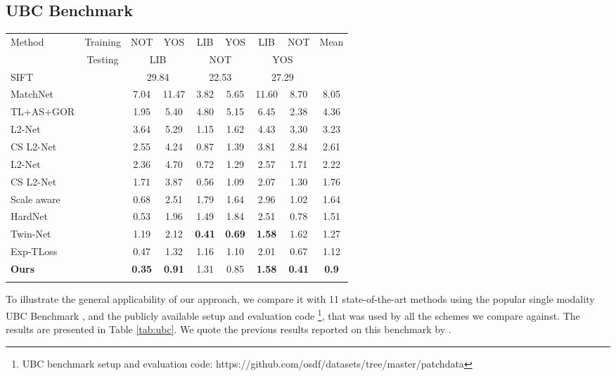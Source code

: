\documentclass[10pt,journal]{IEEEtran}\usepackage{amsfonts}
\begin{document}
\subsection{UBC Benchmark}

\begin{table*}[th]
\centering
\begin{tabular}{lcccccccc}
\toprule Method & Training & NOT & YOS & LIB & YOS & LIB & NOT & Mean \\
\multicolumn{1}{c}{} & Testing & \multicolumn{2}{c}{LIB} &
\multicolumn{2}{c}{NOT} & \multicolumn{2}{c}{YOS} &  \\
\midrule SIFT \cite{SIFT} &  & \multicolumn{2}{c}{29.84} &
\multicolumn{2}{c}{22.53} & \multicolumn{2}{c}{27.29} &  \\
MatchNet \cite{MatchNet} &  & 7.04 & 11.47 & 3.82 & 5.65 & 11.60 & 8.70 &
8.05 \\
TL+AS+GOR \cite{SpreadOutDescriptors} &  & 1.95 & 5.40 & 4.80 & 5.15 & 6.45
& 2.38 & 4.36 \\
L2-Net \cite{L2Net} &  & 3.64 & 5.29 & 1.15 & 1.62 & 4.43 & 3.30 & 3.23 \\
CS L2-Net \cite{L2Net} &  & 2.55 & 4.24 & 0.87 & 1.39 & 3.81 & 2.84 & 2.61
\\
L2-Net \cite{L2Net} &  & 2.36 & 4.70 & 0.72 & 1.29 & 2.57 & 1.71 & 2.22 \\
CS L2-Net \cite{L2Net} &  & 1.71 & 3.87 & 0.56 & 1.09 & 2.07 & 1.30 & 1.76
\\
Scale aware \cite{ScaleAware} &  & 0.68 & 2.51 & 1.79 & 1.64 & 2.96 & 1.02 &
1.64 \\
HardNet \cite{HardNet} &  & 0.53 & 1.96 & 1.49 & 1.84 & 2.51 & 0.78 & 1.51
\\
Twin-Net \cite{Twin_net} &  & 1.19 & 2.12 & \textbf{0.41} & \textbf{0.69} &
\textbf{1.58} & 1.62 & 1.27 \\
Exp-TLoss \cite{BetterAndFaster} &  & 0.47 & 1.32 & 1.16 & 1.10 & 2.01 & 0.67
& 1.12 \\
\textbf{Ours} &  & \textbf{0.35} & \textbf{0.91} & 1.31 & 0.85 & \textbf{1.58} & \textbf{0.41} & \textbf{0.9} \\
\bottomrule &  &  &  &  &  &  &  &
\end{tabular}\caption{Patch matching results evaluated on the UBC Benchmark \protect\cite {UBC_benchmark}. Score is given in terms of FPR95.\newline
LIB: Liberty, NOT: Notredame, YOS: Yosemite.}
\label{tab:ubc}
\end{table*}
To illustrate the general applicability of our approach, we compare it with
11 state-of-the-art methods using the popular single modality UBC Benchmark
\cite{UBC_benchmark}, and the publicly available setup and evaluation code
\footnote{UBC benchmark setup and evaluation code:
https://github.com/osdf/datasets/tree/master/patchdata}, that was used by
all the schemes we compare against. The results are presented in Table \ref {tab:ubc}. We quote the previous results reported on this benchmark by \cite {BetterAndFaster, Twin_net}.
\end{document}
